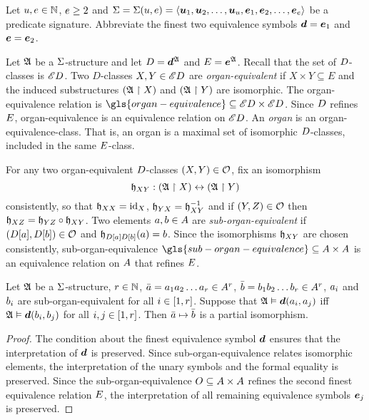 
Let $u, e \in \mathbb{N}$, $e \geq 2$ and
$\mathrm{\Sigma} = \mathrm{\Sigma}(u, e) = 
\left\langle \bm{u}_{1},\bm{u}_{2},\dots,\bm{u}_{u},\bm{e}_{1},\bm{e}_{2},\dots,\bm{e}_{e} \right\rangle$
be a predicate signature.
Abbreviate the finest two equivalence symbols $\bm{d} = \bm{e}_{1}$ and $\bm{e} = \bm{e}_{2}$.
\begin{definition}
Let $\mathfrak{A}$ be a $\mathrm{\Sigma}$-structure and let $D = \bm{d}^{\mathfrak{A}}$ and
$E = \bm{e}^{\mathfrak{A}}$.
Recall that the set of $D$-classes is ${\mathscr{E}D}$.
Two $D$-classes $X, Y \in {\mathscr{E}D}$ are \emph{organ-equivalent}
if $X \times Y \subseteq E$ and the induced substructures 
$(\mathfrak{A} \restriction X)$ and $(\mathfrak{A} \restriction Y)$ are isomorphic.
The organ-equivalence relation is
$\gls{organ-equivalence} \subseteq \domXX{\Ecl\relD}$.
Since $D$ refines $E$, organ-equivalence is an equivalence relation
on ${\mathscr{E}D}$.
An \emph{organ} is an organ-equivalence-class. That is, an organ
is a maximal set of isomorphic $D$-classes, included in the same
$E$-class.

For any two organ-equivalent $D$-classes $(X, Y) \in \mathcal{O}$,
fix an isomorphism
\[
  \mathfrak{h}_{XY} : (\mathfrak{A} \restriction X) \leftrightarrow (\mathfrak{A} \restriction Y)
\]
consistently, so that $\mathfrak{h}_{XX} = \operatorname{id}_{X}$,
$\mathfrak{h}_{YX} = \mathfrak{h}_{XY}^{-1}$
and if $(Y, Z) \in \mathcal{O}$ then
$\mathfrak{h}_{XZ} = \mathfrak{h}_{YZ} \circ \mathfrak{h}_{XY}$.
Two elements $a, b \in A$ are \emph{sub-organ-equivalent}
if $(D[a], D[b]) \in \mathcal{O}$ and
$\mathfrak{h}_{D[a]D[b]}(a) = b$.
Since the isomorphisms $\mathfrak{h}_{XY}$ are chosen consistently,
sub-organ-equivalence 
$\gls{sub-organ-equivalence} \subseteq \domAA$ is an equivalence relation on
$A$ that refines $E$.
\end{definition}

\begin{remark}\label{rem:monadic-same-organ-iso}
Let $\mathfrak{A}$ be a $\mathrm{\Sigma}$-structure, $r \in \mathbb{N}$,
$\bar{a} = a_{1}a_{2}\dots a_{r} \in A^r$,
$\bar{b} = b_{1}b_{2}\dots b_{r} \in A^r$,
$a_{i}$ and $b_{i}$ are sub-organ-equivalent for all $i \in [1,r]$.
Suppose that
$\mathfrak{A} \vDash \bm{d}(a_{i}, a_{j})$ iff $\mathfrak{A} \vDash \bm{d}(b_{i}, b_{j})$
for all $i, j \in [1,r]$.
Then $\bar{a} \mapsto \bar{b}$ is a partial isomorphism.
\end{remark}
\begin{proof}
The condition about the finest equivalence symbol $\bm{d}$ ensures that the
interpretation of $\bm{d}$ is preserved.
Since sub-organ-equivalence relates isomorphic elements, the interpretation of
the unary symbols and the formal equality is preserved.
Since the sub-organ-equivalence $O \subseteq {A\times A}$ refines the
second finest equivalence relation $E$, the interpretation of all remaining
equivalence symbols $\bm{e}_{j}$ is preserved.
\end{proof}

